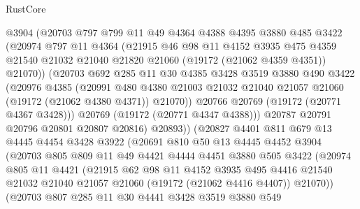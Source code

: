 \begin{lexlean}{RustCore}
\begin{coremodule}
            @3904
            (@20703
              @797
              @799
              @11
              @49
              @4364
              @4388
              @4395
              @3880
              @485
              @3422
              (@20974
                @797
                @11
                @4364
                (@21915
                  @46
                  @98
                  @11
                  @4152
                  @3935
                  @475
                  @4359
                  @21540
                  @21032
                  @21040
                  @21820
                  @21060
                  (@19172 (@21062 @4359 @4351))
                  @21070))
              (@20703
                @692
                @285
                @11
                @30
                @4385
                @3428
                @3519
                @3880
                @490
                @3422
                (@20976
                  @4385
                  (@20991
                    @480
                    @4380
                    @21003
                    @21032
                    @21040
                    @21057
                    @21060
                    (@19172 (@21062 @4380 @4371))
                    @21070))
                @20766
                @20769
                (@19172 (@20771 @4367 @3428)))
              @20769
              (@19172 (@20771 @4347 @4388)))
            @20787
            @20791
            @20796
            @20801
            @20807
            @20816)
          @20893))
      (@20827
        @4401
        @811
        @679
        @13
        @4445
        @4454
        @3428
        @3922
        (@20691
          @810
          @50
          @13
          @4445
          @4452
          @3904
          (@20703
            @805
            @809
            @11
            @49
            @4421
            @4444
            @4451
            @3880
            @505
            @3422
            (@20974
              @805
              @11
              @4421
              (@21915
                @62
                @98
                @11
                @4152
                @3935
                @495
                @4416
                @21540
                @21032
                @21040
                @21057
                @21060
                (@19172 (@21062 @4416 @4407))
                @21070))
            (@20703
              @807
              @285
              @11
              @30
              @4441
              @3428
              @3519
              @3880
              @549

\end{coremodule}
\end{lexlean}
